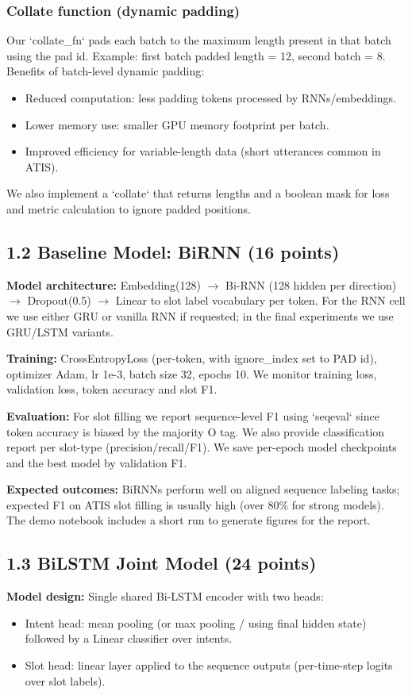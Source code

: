 \documentclass[conference]{IEEEtran}
\begin{document}
\subsubsection{Collate function (dynamic padding)}
Our `collate_fn` pads each batch to the maximum length present in that batch using the pad id. Example: first batch padded length = 12, second batch = 8. Benefits of batch-level dynamic padding:
\begin{itemize}
  \item Reduced computation: less padding tokens processed by RNNs/embeddings.
  \item Lower memory use: smaller GPU memory footprint per batch.
  \item Improved efficiency for variable-length data (short utterances common in ATIS).
\end{itemize}
We also implement a `collate` that returns lengths and a boolean mask for loss and metric calculation to ignore padded positions.

\subsection{1.2 Baseline Model: BiRNN (16 points)}
\textbf{Model architecture:} Embedding(128) $\rightarrow$ Bi-RNN (128 hidden per direction) $\rightarrow$ Dropout(0.5) $\rightarrow$ Linear to slot label vocabulary per token. For the RNN cell we use either GRU or vanilla RNN if requested; in the final experiments we use GRU/LSTM variants.

\textbf{Training:} CrossEntropyLoss (per-token, with ignore\_index set to PAD id), optimizer Adam, lr 1e-3, batch size 32, epochs 10. We monitor training loss, validation loss, token accuracy and slot F1.

\textbf{Evaluation:} For slot filling we report sequence-level F1 using `seqeval` since token accuracy is biased by the majority O tag. We also provide classification report per slot-type (precision/recall/F1). We save per-epoch model checkpoints and the best model by validation F1.

\textbf{Expected outcomes:} BiRNNs perform well on aligned sequence labeling tasks; expected F1 on ATIS slot filling is usually high (over 80\% for strong models). The demo notebook includes a short run to generate figures for the report.

\subsection{1.3 BiLSTM Joint Model (24 points)}
\textbf{Model design:} Single shared Bi-LSTM encoder with two heads:
\begin{itemize}
  \item Intent head: mean pooling (or max pooling / using final hidden state) followed by a Linear classifier over intents.
  \item Slot head: linear layer applied to the sequence outputs (per-time-step logits over slot labels).
\end{itemize}
\end{document}
